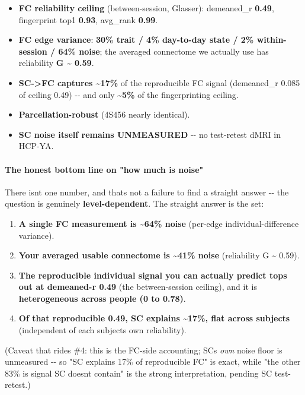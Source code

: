 \begin{itemize}
\tightlist
\item
  \textbf{FC reliability ceiling} (between-session, Glasser): demeaned\_r \textbf{0.49}, fingerprint top1 \textbf{0.93}, avg\_rank \textbf{0.99}.
\item
  \textbf{FC edge variance}: \textbf{30\% trait / 4\% day-to-day state / 2\% within-session / 64\% noise}; the averaged connectome we actually use has reliability \textbf{G \textasciitilde{} 0.59}.
\item
  \textbf{SC-\textgreater FC captures \textasciitilde17\%} of the reproducible FC signal (demeaned\_r 0.085 of ceiling 0.49) -\/- and only \textbf{\textasciitilde5\%} of the fingerprinting ceiling.
\item
  \textbf{Parcellation-robust} (4S456 nearly identical).
\item
  \textbf{SC noise itself remains UNMEASURED} -\/- no test-retest dMRI in HCP-YA.
\end{itemize}

\paragraph{The honest bottom line on "how much is noise"}\label{the-honest-bottom-line-on-how-much-is-noise}

There isn\textquotesingle t one number, and that\textquotesingle s not a failure to find a straight answer -\/- the question is genuinely \textbf{level-dependent}. The straight answer is the set:

\begin{enumerate}
\def\labelenumi{\arabic{enumi}.}
\tightlist
\item
  \textbf{A single FC measurement is \textasciitilde64\% noise} (per-edge individual-difference variance).
\item
  \textbf{Your averaged usable connectome is \textasciitilde41\% noise} (reliability G \textasciitilde{} 0.59).
\item
  \textbf{The reproducible individual signal you can actually predict tops out at demeaned-r 0.49} (the between-session ceiling), and it is \textbf{heterogeneous across people (0 to 0.78)}.
\item
  \textbf{Of that reproducible 0.49, SC explains \textasciitilde17\%, flat across subjects} (independent of each subject\textquotesingle s own reliability).
\end{enumerate}

(Caveat that rides \#4: this is the FC-side accounting; SC\textquotesingle s \emph{own} noise floor is unmeasured -\/- so "SC explains 17\% of reproducible FC" is exact, while "the other 83\% is signal SC doesn\textquotesingle t contain" is the strong interpretation, pending SC test-retest.)


